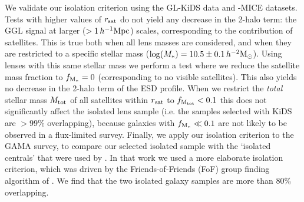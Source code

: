 \documentclass[usenatbib]{mnras}
\newcommand{\hmsun}{\,h^{-2} {\rm M_\odot}}
\newcommand{\hMpc}{\, h^{-1}{\rm{Mpc}} }
\newcommand{\un}[1]{_{\rm #1}}
\begin{document}
We validate our isolation criterion using the GL-KiDS data and -MICE datasets. Tests with higher values of $r\un{sat}$ do not yield any decrease in the 2-halo term: the GGL signal at larger ($>1\hMpc$) scales, corresponding to the contribution of satellites. This is true both when all lens masses are considered, and when they are restricted to a specific stellar mass ($\log(M_*)=10.5\pm0.1\hmsun$). Using lenses with this same stellar mass we perform a test where we reduce the satellite mass fraction to $f\un{M_*}=0$ (corresponding to no visible satellites). This also yields no decrease in the 2-halo term of the ESD profile. When we restrict the \emph{total} stellar mass $M\un{tot}$ of all satellites within $r\un{sat}$ to $f\un{M\un{tot}}<0.1$ this does not significantly affect the isolated lens sample (i.e. the samples selected with KiDS are $>99\%$ overlapping), because galaxies with $f\un{M_*}\ll0.1$ are not likely to be observed in a flux-limited survey. Finally, we apply our isolation criterion to the GAMA survey, to compare our selected isolated sample with the `isolated centrals' that were used by \cite{brouwer2017}. In that work we used a more elaborate isolation criterion, which was driven by the Friends-of-Friends (FoF) group finding algorithm of \cite{robotham2011}. We find that the two isolated galaxy samples are more than $80\%$ overlapping.
\end{document}
